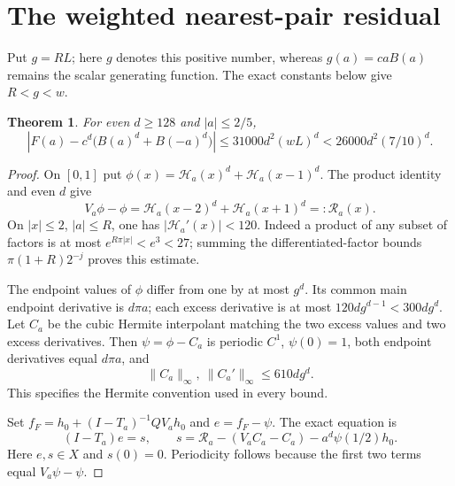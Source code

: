 \documentclass[11pt,a4paper]{article}
\newtheorem{theorem}{Theorem}[section]\newtheorem{lemma}[theorem]{Lemma}\newtheorem{proposition}[theorem]{Proposition}
\theoremstyle{remark}\newtheorem*{ednote}{Editorial note (ProveIt, 2026-10-01)}
\begin{document}
\section{The weighted nearest-pair residual}
Put $g=RL$; here $g$ denotes this positive number, whereas $g(a)=caB(a)$ remains the scalar generating function. The exact constants below give $R<g<w$.
\begin{theorem}\label{thm:disk}
For even $d\ge128$ and $|a|\le2/5$,
\begin{equation}\label{eq:disk}
 \left|F(a)-c^d\bigl(B(a)^d+B(-a)^d\bigr)\right|
 \le31000d^2(wL)^d<26000d^2(7/10)^d.
\end{equation}
\end{theorem}
\begin{proof}
On $[0,1]$ put $\phi(x)=\mathcal H_a(x)^d+\mathcal H_a(x-1)^d$. The product identity and even $d$ give
\begin{equation}\label{eq:residual}
 V_a\phi-\phi=\mathcal H_a(x-2)^d+\mathcal H_a(x+1)^d=:\mathcal R_a(x).
\end{equation}
On $|x|\le2$, $|a|\le R$, one has $|\mathcal H_a'(x)|<120$. Indeed a product of any subset of factors is at most $e^{R\pi|x|}<e^3<27$; summing the differentiated-factor bounds $\pi(1+R)2^{-j}$ proves this estimate.

The endpoint values of $\phi$ differ from one by at most $g^d$. Its common main endpoint derivative is $d\pi a$; each excess derivative is at most $120d g^{d-1}<300d g^d$. Let $C_a$ be the cubic Hermite interpolant matching the two excess values and two excess derivatives. Then $\psi=\phi-C_a$ is periodic $C^1$, $\psi(0)=1$, both endpoint derivatives equal $d\pi a$, and
\[
 \|C_a\|_\infty,\ \|C_a'\|_\infty\le610d g^d.
\]
This specifies the Hermite convention used in every bound.

Set $f_F=h_0+(I-T_a)^{-1}QV_ah_0$ and $e=f_F-\psi$. The exact equation is
\[
 (I-T_a)e=s,\qquad
 s=\mathcal R_a-(V_aC_a-C_a)-a^d\psi(1/2)h_0.
\]
Here $e,s\in X$ and $s(0)=0$. Periodicity follows because the first two terms equal $V_a\psi-\psi$.


\end{proof}
\end{document}

